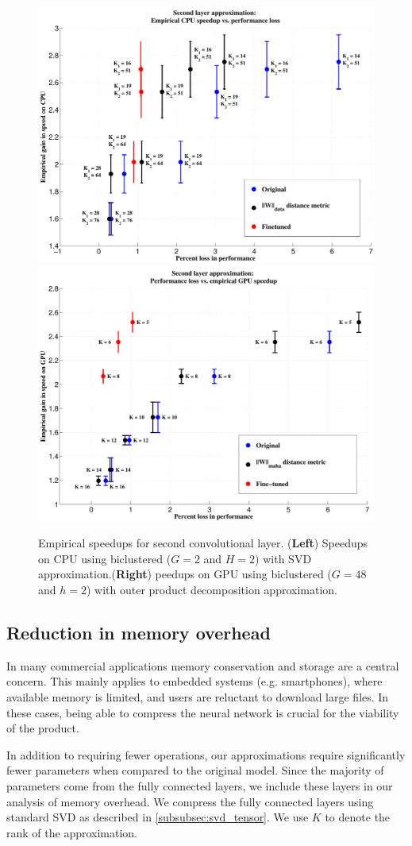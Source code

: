 \begin{figure}[t]
\centering
\begin{minipage}{0.9\textwidth}
      \includegraphics[width=0.5\linewidth]{img/layer2_CPUspeedup_vs_performance_loss_finetune_and_orig.pdf}
      \quad\quad
      \includegraphics[width=0.5\linewidth]{img/layer2_GPUspeedup_vs_performance_loss_finetune_and_orig.pdf}
\end{minipage}
\caption{Empirical speedups for second convolutional layer. ({\bf Left}) Speedups on CPU using biclustered ($G = 2$ and $H = 2$) with SVD approximation.({\bf Right}) peedups on GPU using biclustered ($G = 48$ and $h = 2$) with outer product decomposition approximation.}
\label{fig:biclust_speedups}
\end{figure}


\subsection{Reduction in memory overhead}
In many commercial applications memory conservation and storage are a
central concern. This mainly applies to embedded systems
(e.g. smartphones), where available memory is limited, and users are
reluctant to download large files. In these cases, being able to
compress the neural network is crucial for the viability of the
product. 

In addition to requiring fewer operations, our approximations
require significantly fewer parameters when compared to the original
model. 
Since the majority of parameters come from the fully connected layers, we include these layers in our analysis of memory overhead. We compress the fully connected layers using standard SVD as described in \ref{subsubsec:svd_tensor}. We use $K$ to denote the rank of the approximation.
 
